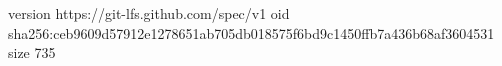 version https://git-lfs.github.com/spec/v1
oid sha256:ceb9609d57912e1278651ab705db018575f6bd9c1450ffb7a436b68af3604531
size 735
